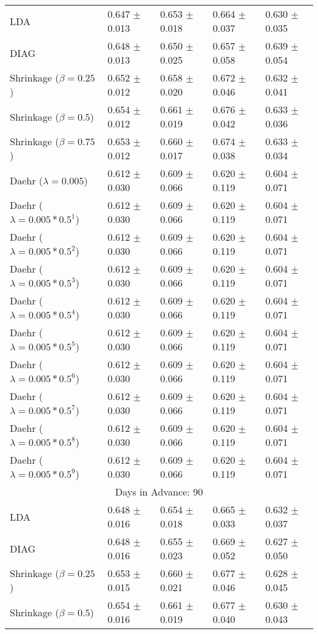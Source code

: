 \begin{table}
\begin{tabular}{*{5}{l}}
LDA&0.647 $\pm$ 0.013&0.653 $\pm$ 0.018&0.664 $\pm$ 0.037&0.630 $\pm$ 0.035\\
DIAG&0.648 $\pm$ 0.013&0.650 $\pm$ 0.025&0.657 $\pm$ 0.058&0.639 $\pm$ 0.054\\
Shrinkage ($\beta=0.25$)&0.652 $\pm$ 0.012&0.658 $\pm$ 0.020&0.672 $\pm$ 0.046&0.632 $\pm$ 0.041\\
Shrinkage ($\beta=0.5$)&0.654 $\pm$ 0.012&0.661 $\pm$ 0.019&0.676 $\pm$ 0.042&0.633 $\pm$ 0.036\\
Shrinkage ($\beta=0.75$)&0.653 $\pm$ 0.012&0.660 $\pm$ 0.017&0.674 $\pm$ 0.038&0.633 $\pm$ 0.034\\
Daehr ($\lambda=0.005$)&0.612 $\pm$ 0.030&0.609 $\pm$ 0.066&0.620 $\pm$ 0.119&0.604 $\pm$ 0.071\\
Daehr ($\lambda=0.005*0.5^1$)&0.612 $\pm$ 0.030&0.609 $\pm$ 0.066&0.620 $\pm$ 0.119&0.604 $\pm$ 0.071\\
Daehr ($\lambda=0.005*0.5^2$)&0.612 $\pm$ 0.030&0.609 $\pm$ 0.066&0.620 $\pm$ 0.119&0.604 $\pm$ 0.071\\
Daehr ($\lambda=0.005*0.5^3$)&0.612 $\pm$ 0.030&0.609 $\pm$ 0.066&0.620 $\pm$ 0.119&0.604 $\pm$ 0.071\\
Daehr ($\lambda=0.005*0.5^4$)&0.612 $\pm$ 0.030&0.609 $\pm$ 0.066&0.620 $\pm$ 0.119&0.604 $\pm$ 0.071\\
Daehr ($\lambda=0.005*0.5^5$)&0.612 $\pm$ 0.030&0.609 $\pm$ 0.066&0.620 $\pm$ 0.119&0.604 $\pm$ 0.071\\
Daehr ($\lambda=0.005*0.5^6$)&0.612 $\pm$ 0.030&0.609 $\pm$ 0.066&0.620 $\pm$ 0.119&0.604 $\pm$ 0.071\\
Daehr ($\lambda=0.005*0.5^7$)&0.612 $\pm$ 0.030&0.609 $\pm$ 0.066&0.620 $\pm$ 0.119&0.604 $\pm$ 0.071\\
Daehr ($\lambda=0.005*0.5^8$)&0.612 $\pm$ 0.030&0.609 $\pm$ 0.066&0.620 $\pm$ 0.119&0.604 $\pm$ 0.071\\
Daehr ($\lambda=0.005*0.5^9$)&0.612 $\pm$ 0.030&0.609 $\pm$ 0.066&0.620 $\pm$ 0.119&0.604 $\pm$ 0.071\\
\hline\multicolumn{5}{c}{  Days in Advance: 90}\\\hline
LDA&0.648 $\pm$ 0.016&0.654 $\pm$ 0.018&0.665 $\pm$ 0.033&0.632 $\pm$ 0.037\\
DIAG&0.648 $\pm$ 0.016&0.655 $\pm$ 0.023&0.669 $\pm$ 0.052&0.627 $\pm$ 0.050\\
Shrinkage ($\beta=0.25$)&0.653 $\pm$ 0.015&0.660 $\pm$ 0.021&0.677 $\pm$ 0.046&0.628 $\pm$ 0.045\\
Shrinkage ($\beta=0.5$)&0.654 $\pm$ 0.016&0.661 $\pm$ 0.019&0.677 $\pm$ 0.040&0.630 $\pm$ 0.043\\

\end{tabular}
\end{table}
